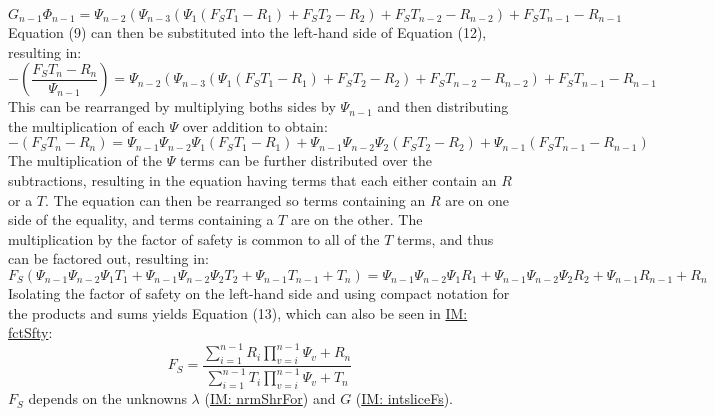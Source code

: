 \documentclass[12pt]{article}
\begin{document}
\begin{displaymath}
G_{n-1} Φ_{n-1}=Ψ_{n-2} \left(Ψ_{n-3} \left(Ψ_{1} \left({F_{S}} T_{1}-R_{1}\right)+{F_{S}} T_{2}-R_{2}\right)+{F_{S}} T_{n-2}-R_{n-2}\right)+{F_{S}} T_{n-1}-R_{n-1}
\end{displaymath}
Equation (9) can then be substituted into the left-hand side of Equation (12), resulting in:
\begin{displaymath}
-\left(\frac{{F_{S}} T_{n}-R_{n}}{Ψ_{n-1}}\right)=Ψ_{n-2} \left(Ψ_{n-3} \left(Ψ_{1} \left({F_{S}} T_{1}-R_{1}\right)+{F_{S}} T_{2}-R_{2}\right)+{F_{S}} T_{n-2}-R_{n-2}\right)+{F_{S}} T_{n-1}-R_{n-1}
\end{displaymath}
This can be rearranged by multiplying boths sides by $Ψ_{n-1}$ and then distributing the multiplication of each $Ψ$ over addition to obtain:
\begin{displaymath}
-\left({F_{S}} T_{n}-R_{n}\right)=Ψ_{n-1} Ψ_{n-2} Ψ_{1} \left({F_{S}} T_{1}-R_{1}\right)+Ψ_{n-1} Ψ_{n-2} Ψ_{2} \left({F_{S}} T_{2}-R_{2}\right)+Ψ_{n-1} \left({F_{S}} T_{n-1}-R_{n-1}\right)
\end{displaymath}
The multiplication of the $Ψ$ terms can be further distributed over the subtractions, resulting in the equation having terms that each either contain an $R$ or a $T$. The equation can then be rearranged so terms containing an $R$ are on one side of the equality, and terms containing a $T$ are on the other. The multiplication by the factor of safety is common to all of the $T$ terms, and thus can be factored out, resulting in:
\begin{displaymath}
{F_{S}} \left(Ψ_{n-1} Ψ_{n-2} Ψ_{1} T_{1}+Ψ_{n-1} Ψ_{n-2} Ψ_{2} T_{2}+Ψ_{n-1} T_{n-1}+T_{n}\right)=Ψ_{n-1} Ψ_{n-2} Ψ_{1} R_{1}+Ψ_{n-1} Ψ_{n-2} Ψ_{2} R_{2}+Ψ_{n-1} R_{n-1}+R_{n}
\end{displaymath}
Isolating the factor of safety on the left-hand side and using compact notation for the products and sums yields Equation (13), which can also be seen in \hyperref[IM:fctSfty]{IM: fctSfty}:
\begin{displaymath}
{F_{S}}=\frac{\displaystyle\sum_{i=1}^{n-1}{R_{i} \displaystyle\prod_{v=i}^{n-1}{Ψ_{v}}}+R_{n}}{\displaystyle\sum_{i=1}^{n-1}{T_{i} \displaystyle\prod_{v=i}^{n-1}{Ψ_{v}}}+T_{n}}
\end{displaymath}
${F_{S}}$ depends on the unknowns $λ$ (\hyperref[IM:nrmShrFor]{IM: nrmShrFor}) and $G$ (\hyperref[IM:intsliceFs]{IM: intsliceFs}).
\par~
\end{document}
